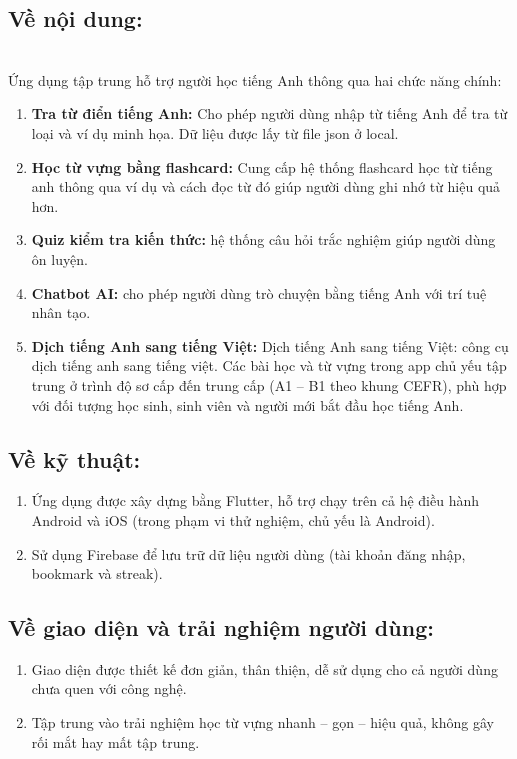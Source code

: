 \subsection{Về nội dung:}\\
 Ứng dụng tập trung hỗ trợ người học tiếng Anh thông qua hai chức năng chính:
 
\begin{enumerate}
    \item \textbf{Tra từ điển tiếng Anh:} Cho phép người dùng nhập từ tiếng Anh để tra từ loại và ví dụ minh họa. Dữ liệu được lấy từ file json ở local.
    \item \textbf{Học từ vựng bằng flashcard:} Cung cấp hệ thống flashcard học từ tiếng anh thông qua ví dụ và cách đọc từ đó giúp người dùng ghi nhớ từ hiệu quả hơn.
    \item \textbf{Quiz kiểm tra kiến thức:} hệ thống câu hỏi trắc nghiệm giúp người dùng ôn luyện.
    \item \textbf{Chatbot AI:} cho phép người dùng trò chuyện bằng tiếng Anh với trí tuệ nhân tạo.
    \item \textbf{Dịch tiếng Anh sang tiếng Việt:} Dịch tiếng Anh sang tiếng Việt: công cụ dịch tiếng anh sang tiếng việt.
Các bài học và từ vựng trong app chủ yếu tập trung ở trình độ sơ cấp đến trung cấp (A1 – B1 theo khung CEFR), phù hợp với đối tượng học sinh, sinh viên và người mới bắt đầu học tiếng Anh.
\end{enumerate}
    
    \subsection{ Về kỹ thuật:} 
    \begin{enumerate}
    \item \textbf{}Ứng dụng được xây dựng bằng Flutter, hỗ trợ chạy trên cả hệ điều hành Android và iOS (trong phạm vi thử nghiệm, chủ yếu là Android).
    \item \textbf{} Sử dụng Firebase để lưu trữ dữ liệu người dùng (tài khoản đăng nhập, bookmark và streak).
    \end{enumerate}


    \subsection{Về giao diện và trải nghiệm người dùng:} 
    \begin{enumerate}
    \item \textbf{}Giao diện được thiết kế đơn giản, thân thiện, dễ sử dụng cho cả người dùng chưa quen với công nghệ.
    \item \textbf{}Tập trung vào trải nghiệm học từ vựng nhanh – gọn – hiệu quả, không gây rối mắt hay mất tập trung.
    \end{enumerate}
    
